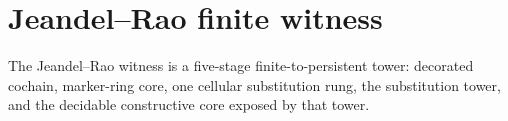 \section{Jeandel--Rao finite witness}

The Jeandel--Rao witness is a five-stage finite-to-persistent tower: decorated
cochain, marker-ring core, one cellular substitution rung, the substitution
tower, and the decidable constructive core exposed by that tower.







